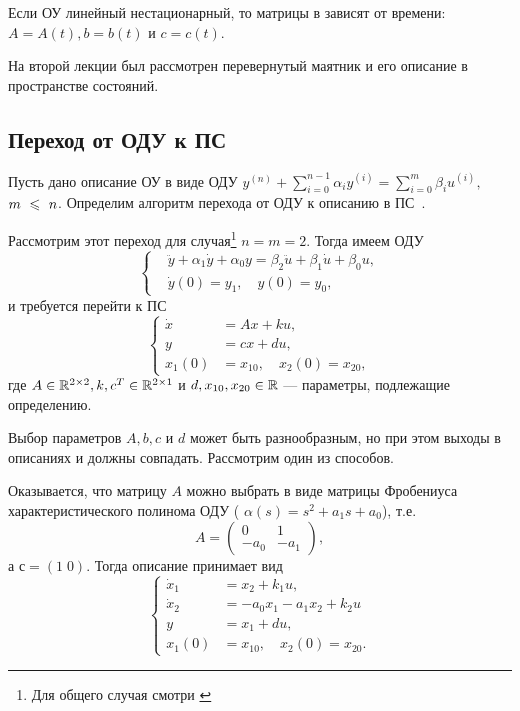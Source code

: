 \documentclass[../../TAU.tex]{subfiles}
\begin{document}
    Если ОУ линейный нестационарный, то матрицы в  зависят от времени: ${A=A(t), b=b(t)}$ и ${c=c(t)}$.

    На второй лекции был рассмотрен перевернутый маятник и его описание в пространстве состояний.

\subsection{Переход от ОДУ к ПС}

    Пусть дано описание ОУ в виде ОДУ  {}
    ${y^{(n)}+\sum_{i=0}^{n-1}\alpha_iy^{(i)}=\sum_{i=0}^{m}\beta_iu^{(i)},\;}$ ${m~\leqslant~n}$. 
    Определим алгоритм перехода от ОДУ к описанию в ПС~.

    Рассмотрим этот переход для случая\footnote{Для общего случая смотри \cite{pandia}} ${n=m=2}$. Тогда имеем ОДУ
    \begin{equation}\label{ODU_2}
        \left\{
        \begin{aligned}
            &\ddot y + \alpha_1 \dot y + \alpha_0 y = \beta_2 \ddot{u} + \beta_1 \dot u + \beta_0 u,\\
            &\dot y(0) = y_1,\quad y(0) = y_0,
        \end{aligned}\right.
    \end{equation}
        и требуется перейти к ПС
    \begin{equation}\label{STDS_2}
        \left\{
        \begin{aligned}
            \dot x &= Ax + ku,\\
            y &= cx + du,\\
            x_1(0) &= x_{10},\quad x_2(0) = x_{20},
        \end{aligned}
        \right.
    \end{equation}
    где 
    $A\in\mathbb{R}^{2\times2}, k, c^T\in\mathbb{R}^{2\times1}$ 
    и 
    $d,x_{10}, x_{20}\in\mathbb{R}$ --- 
    параметры, подлежащие определению.

    Выбор параметров $A,b,c$ и $d$ может быть разнообразным, но при этом выходы в описаниях  и  должны совпадать. Рассмотрим один из способов.

    Оказывается, что матрицу $A$ можно выбрать в виде матрицы Фробениуса характеристического полинома ОДУ  (
    ${\alpha(s) = s^2+a_1s+a_0}$), 
    т.е.
    $$
        A =
        \begin{pmatrix}
            0&    1\\
            -a_0& -a_1
        \end{pmatrix},
    $$
    а ${с = (1\; 0)}$. Тогда описание  принимает вид
    \begin{equation}\label{EQ1}
        \left\{
        \begin{aligned}
            \dot x_1 &= x_2 + k_1 u,\\
            \dot x_2 &= -a_0x_1-a_1x_2+k_2u\\
            y &= x_1 + du,\\
            x_1(0) &= x_{10},\quad x_2(0) = x_{20}.
        \end{aligned}
        \right.
    \end{equation}
\end{document}
